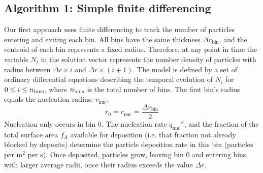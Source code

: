 \documentclass[final,3p,times,twocolumn, 12pt]{elsarticle}
\begin{document}
\subsection{Algorithm 1: Simple finite differencing}
Our first approach uses finite differencing to track the number of particles entering and exiting each bin. All bins have the same thickness $\Delta r_{\mathrm{bin}}$, and the centroid of each bin represents a fixed radius.  Therefore, at any point in time the variable $N_i$ in the solution vector represents the number density of particles with radius between $\Delta r \times i$ and $\Delta r \times (i+1)$.  The model is defined by a set of ordinary differential equations describing the temporal evolution of $N_i$ for $0\leq i \leq n_{\rm bins}$, where $n_{\rm bins}$ is the total number of bins. 
The first bin's radius equals the nucleation radius: $r_\mathrm{nuc}$. 
\begin{equation}
    r_0 = r_\mathrm{nuc}=\frac{\Delta r_\mathrm{bin}}{2}
    \label{eq:r_0}
\end{equation}
Nucleation only occurs in bin 0. The nucleation rate $\dot{q}_\mathrm{nuc}''$, and the fraction of the total surface area $f_A$ available for deposition (i.e. that fraction not already blocked by deposits) determine the particle deposition rate in this bin (particles per m$^2$ per s). Once deposited, particles grow, leaving bin 0 and entering bins with larger average radii, once their radius exceeds the value $\Delta r$. 
\end{document}
